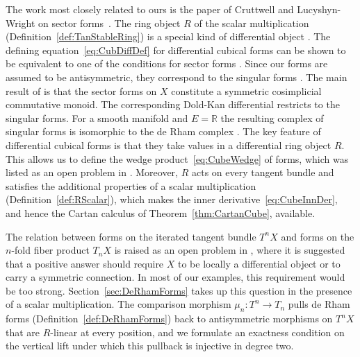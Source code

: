 \documentclass[12pt,reqno, a4paper]{amsart}
\numberwithin{equation}{section}
\theoremstyle{plain}
\theoremstyle{definition}
\theoremstyle{remark}
\newcommand{\bbR}{\mathbb{R}}
\begin{document}
The work most closely related to ours is the paper of Cruttwell and Lucyshyn-Wright on sector forms~\cite{CruttwellLucyshynWright:2018}. The ring object $R$ of the scalar multiplication (Definition~\ref{def:TanStableRing}) is a special kind of differential object \cite[Def.~3.1]{CockettCruttwell:2018}. The defining equation~\eqref{eq:CubDiffDef} for differential cubical forms can be shown to be equivalent to one of the conditions for sector forms \cite[Def.~3.1, Def.~3.2]{CruttwellLucyshynWright:2018}. Since our forms are assumed to be antisymmetric, they correspond to the singular forms \cite[Def.~8.11]{CruttwellLucyshynWright:2018}. The main result of \cite{CruttwellLucyshynWright:2018} is that the sector forms on $X$ constitute a symmetric cosimplicial commutative monoid. The corresponding Dold-Kan differential restricts to the singular forms. For a smooth manifold and $E = \bbR$ the resulting complex of singular forms is isomorphic to the de Rham complex \cite[Thm.~9.25]{CruttwellLucyshynWright:2018}. The key feature of differential cubical forms is that they take values in a differential ring object $R$. This allows us to define the wedge product~\eqref{eq:CubeWedge} of forms, which was listed as an open problem in \cite[\S 10]{CruttwellLucyshynWright:2018}. Moreover, $R$ acts on every tangent bundle and satisfies the additional properties of a scalar multiplication (Definition~\ref{def:RScalar}), which makes the inner derivative~\eqref{eq:CubeInnDer}, and hence the Cartan calculus of Theorem~\ref{thm:CartanCube}, available.

The relation between forms on the iterated tangent bundle $T^n X$ and forms on the $n$-fold fiber product $T_n X$ is raised as an open problem in \cite[\S 10]{CruttwellLucyshynWright:2018}, where it is suggested that a positive answer should require $X$ to be locally a differential object or to carry a symmetric connection. In most of our examples, this requirement would be too strong. Section~\ref{sec:DeRhamForms} takes up this question in the presence of a scalar multiplication. The comparison morphism $\mu_n: T^n \to T_n$ pulls de Rham forms (Definition~\ref{def:DeRhamForms}) back to antisymmetric morphisms on $T^nX$ that are $R$-linear at every position, and we formulate an exactness condition on the vertical lift under which this pullback is injective in degree two.
\end{document}
